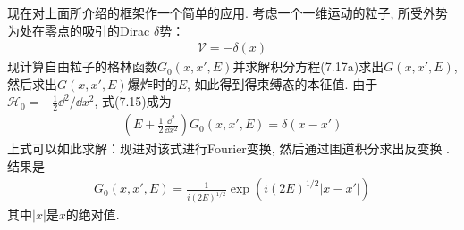 现在对上面所介绍的框架作一个简单的应用. 考虑一个一维运动的粒子, 所受外势为处在零点的吸引的Dirac $\delta$势：
\begin{align}
\mathscr{V} = -\delta(x)
\end{align}
现计算自由粒子的格林函数$G_0(x,x',E)$并求解积分方程(7.17a)求出$G(x,x',E)$, 然后求出$G(x,x',E)$爆炸时的$E$, 如此得到得束缚态的本征值. 由于$\mathscr{H}_0 = -\frac{1}{2}\dd^2/\dd x^2$, 式(7.15)成为
\begin{align}
\left( E + \frac{1}{2}\frac{\dd^2}{\dd x^2} \right) G_0(x,x',E) = \delta(x-x')
\end{align}
上式可以如此求解：现进对该式进行Fourier变换, 然后通过围道积分求出反变换
. 结果是
\begin{align}
G_0(x,x',E) = \frac{1}{i(2E)^{1/2}}\exp(i(2E)^{1/2}|x-x'|)
\end{align}
其中$|x|$是$x$的绝对值.

